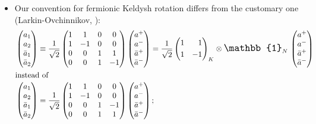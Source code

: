 \documentclass[a4paper,11pt, english]{article}
\theoremstyle{remark}
\begin{document}
\begin{itemize}
  \item Our convention for fermionic Keldysh rotation differs from the customary one (Larkin-Ovchinnikov, \cite{Kamenev2011}):
    \begin{align*}
     &\begin{pmatrix}
   a_1\\ a_2 \\ \bar{a}_1 \\ \bar{a}_2 
   \end{pmatrix}
   \equiv \frac{1}{\sqrt{2}}
   \begin{pmatrix}
   1 & 1 & 0 & 0\\ 1 & -1 & 0 & 0 \\ 0 & 0 & 1 & 1\\ 0 & 0 & 1 & -1 
   \end{pmatrix}
   \begin{pmatrix} 
    a^+ \\ a^- \\ \bar{a}^+ \\ \bar{a}^-
   \end{pmatrix}
   = \frac{1}{\sqrt{2}}
   \left( \begin{aligned} &1 &1\\&1&-1  \end{aligned} \right)_K \otimes \scalebox{1.3}{$\mathbb{1}$}^{ }_N\,\begin{pmatrix} 
    a^+ \\ a^- \\ \bar{a}^+ \\ \bar{a}^-
   \end{pmatrix}\\
   \intertext{instead of}
    &\begin{pmatrix}
   a_1\\ a_2 \\ \bar{a}_1 \\ \bar{a}_2 
   \end{pmatrix}
   = \frac{1}{\sqrt{2}}
   \begin{pmatrix}
   1 & 1 & 0 & 0\\ 1 & -1 & 0 & 0 \\ 0 & 0 & 1 & -1\\ 0 & 0 & 1 & 1 
   \end{pmatrix}
   \begin{pmatrix} 
    a^+ \\ a^- \\ \bar{a}^+ \\ \bar{a}^-
   \end{pmatrix};
    \end{align*}

\end{itemize}
\end{document}
